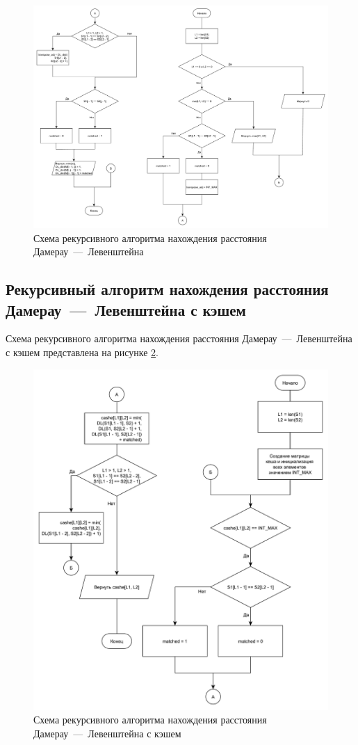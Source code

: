 \begin{figure}[h]
	\centering
	\includegraphics[scale=0.35]{images/dlev_req.pdf}
	\caption{Схема рекурсивного алгоритма нахождения расстояния Дамерау~---~Левенштейна}
	\label{img:dlev_req}
\end{figure}

\newpage

\subsection{Рекурсивный алгоритм нахождения расстояния Дамерау~---~Левенштейна с кэшем}

Схема рекурсивного алгоритма нахождения расстояния Дамерау~---~Левенштейна с кэшем представлена на рисунке \ref{img:dlev_req_cache}.

\begin{figure}[h]
	\centering
	\includegraphics[scale=0.55]{images/dlev_req_cache.pdf}
	\caption{Схема рекурсивного алгоритма нахождения расстояния Дамерау~---~Левенштейна с кэшем}
	\label{img:dlev_req_cache}
\end{figure}

